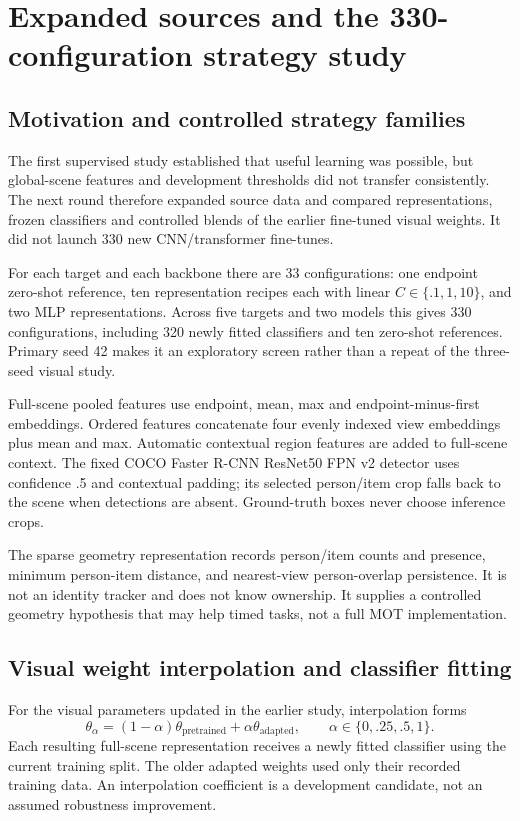 \chapter{Expanded sources and the 330-configuration strategy study}
\label{ch:strategy}
\section{Motivation and controlled strategy families}
The first supervised study established that useful learning was possible, but global-scene features and development thresholds did not transfer consistently. The next round therefore expanded source data and compared representations, frozen classifiers and controlled blends of the earlier fine-tuned visual weights. It did not launch 330 new CNN/transformer fine-tunes.

For each target and each backbone there are 33 configurations: one endpoint zero-shot reference, ten representation recipes each with linear $C\in\{.1,1,10\}$, and two MLP representations. Across five targets and two models this gives 330 configurations, including 320 newly fitted classifiers and ten zero-shot references. Primary seed 42 makes it an exploratory screen rather than a repeat of the three-seed visual study.

Full-scene pooled features use endpoint, mean, max and endpoint-minus-first embeddings. Ordered features concatenate four evenly indexed view embeddings plus mean and max. Automatic contextual region features are added to full-scene context. The fixed COCO Faster R-CNN ResNet50 FPN v2 detector uses confidence .5 and contextual padding; its selected person/item crop falls back to the scene when detections are absent. Ground-truth boxes never choose inference crops.

The sparse geometry representation records person/item counts and presence, minimum person-item distance, and nearest-view person-overlap persistence. It is not an identity tracker and does not know ownership. It supplies a controlled geometry hypothesis that may help timed tasks, not a full MOT implementation.

\section{Visual weight interpolation and classifier fitting}
For the visual parameters updated in the earlier study, interpolation forms
\begin{equation}
\theta_\alpha=(1-\alpha)\theta_{\mathrm{pretrained}}+\alpha\theta_{\mathrm{adapted}},
\qquad \alpha\in\{0,.25,.5,1\}.
\end{equation}
Each resulting full-scene representation receives a newly fitted classifier using the current training split. The older adapted weights used only their recorded training data. An interpolation coefficient is a development candidate, not an assumed robustness improvement.

